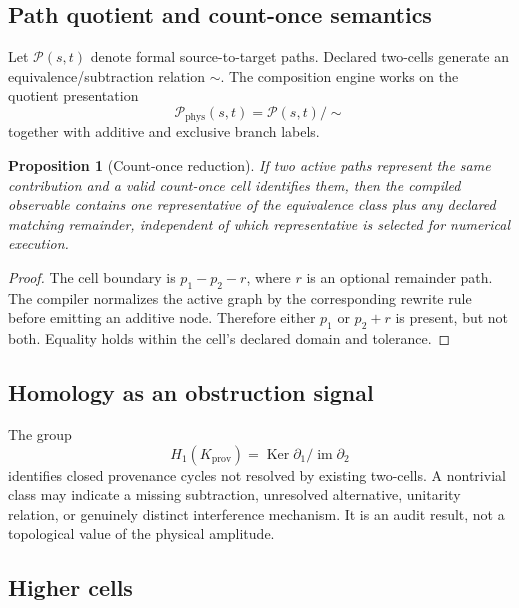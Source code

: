\documentclass[11pt]{article}
\newtheorem{proposition}[definition]{Proposition}
\newcommand{\Ker}{\operatorname{Ker}}
\newcommand{\cP}{\mathcal P}
\newcommand{\Kprov}{K_{\mathrm{prov}}}
\begin{document}
\subsection{Path quotient and count-once semantics}

Let \(\cP(s,t)\) denote formal source-to-target paths.  Declared two-cells
generate an equivalence/subtraction relation \(\sim\).  The composition engine
works on the quotient presentation
\begin{equation}
 \cP_{\mathrm{phys}}(s,t)
 =
 \cP(s,t)/{\sim}
\label{eq:path-quotient}
\end{equation}
together with additive and exclusive branch labels.

\begin{proposition}[Count-once reduction]
If two active paths represent the same contribution and a valid count-once
cell identifies them, then the compiled observable contains one representative
of the equivalence class plus any declared matching remainder, independent of
which representative is selected for numerical execution.
\end{proposition}

\begin{proof}
The cell boundary is \(p_1-p_2-r\), where \(r\) is an optional remainder path.
The compiler normalizes the active graph by the corresponding rewrite rule
before emitting an additive node.  Therefore either \(p_1\) or \(p_2+r\) is
present, but not both.  Equality holds within the cell's declared domain and
tolerance.
\end{proof}

\subsection{Homology as an obstruction signal}

The group
\begin{equation}
 H_1(\Kprov)
 =
 \Ker\partial_1/\operatorname{im}\partial_2
\label{eq:prov-homology-v8}
\end{equation}
identifies closed provenance cycles not resolved by existing two-cells.  A
nontrivial class may indicate a missing subtraction, unresolved alternative,
unitarity relation, or genuinely distinct interference mechanism.  It is an
audit result, not a topological value of the physical amplitude.

\subsection{Higher cells}
\end{document}

